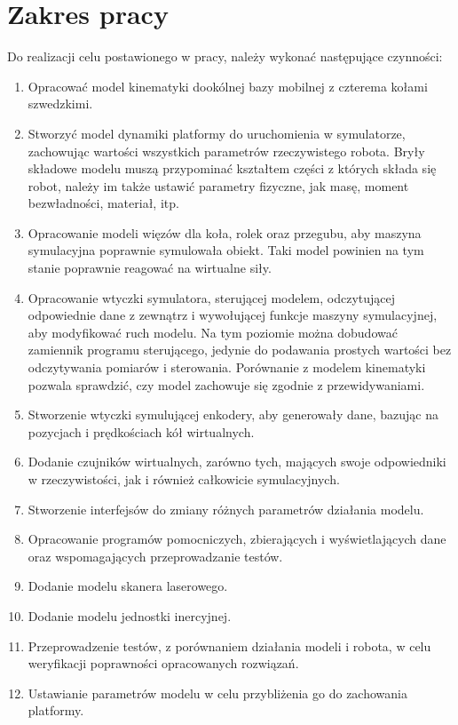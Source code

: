 \section{Zakres pracy}
	Do realizacji celu postawionego w pracy, należy wykonać następujące czynności:
	\begin{enumerate}
	\item Opracować model kinematyki dookólnej bazy mobilnej z czterema kołami szwedzkimi.
	\item Stworzyć model dynamiki platformy do uruchomienia w symulatorze, zachowując wartości wszystkich parametrów rzeczywistego robota.
	Bryły składowe modelu muszą przypominać kształtem części z których składa się robot, należy im także ustawić parametry fizyczne, jak masę, moment bezwładności, materiał, itp.
	\item Opracowanie modeli więzów dla koła, rolek oraz przegubu, aby maszyna symulacyjna poprawnie symulowała obiekt.
	Taki model powinien na tym stanie poprawnie reagować na wirtualne siły.
	\item Opracowanie wtyczki symulatora, sterującej modelem, odczytującej odpowiednie dane z zewnątrz i wywołującej funkcje maszyny symulacyjnej, aby modyfikować ruch modelu.
	Na tym poziomie można dobudować zamiennik programu sterującego, jedynie do podawania prostych wartości bez odczytywania pomiarów i sterowania.
	Porównanie z modelem kinematyki pozwala sprawdzić, czy model zachowuje się zgodnie z przewidywaniami.
	\item Stworzenie wtyczki symulującej enkodery, aby generowały dane, bazując na pozycjach i prędkościach kół wirtualnych.
	\item Dodanie czujników wirtualnych, zarówno tych, mających swoje odpowiedniki w rzeczywistości, jak i również całkowicie symulacyjnych.
	\item Stworzenie interfejsów do zmiany różnych parametrów działania modelu.
	\item Opracowanie programów pomocniczych, zbierających i wyświetlających dane oraz wspomagających przeprowadzanie testów.
	\item Dodanie modelu skanera laserowego.
	\item Dodanie modelu jednostki inercyjnej.
	\item Przeprowadzenie testów, z porównaniem działania modeli i robota, w celu weryfikacji poprawności opracowanych rozwiązań.
	\item Ustawianie parametrów modelu w celu przybliżenia go do zachowania platformy.
	\end{enumerate}
	
